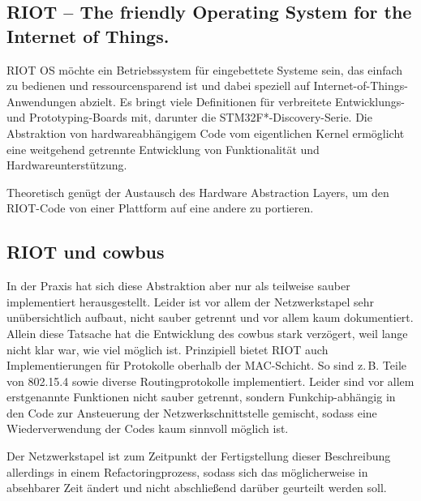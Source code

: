 \documentclass{IEEEtran}
\begin{document}
    \subsection{RIOT -- The friendly Operating System for the Internet of Things.\cite{RIOT}}
        RIOT OS möchte ein Betriebssystem für eingebettete Systeme sein,
        das einfach zu bedienen und ressourcensparend ist und dabei speziell
        auf Internet-of-Things-Anwendungen abzielt. Es bringt viele Definitionen
        für verbreitete Entwicklungs- und Prototyping-Boards mit, darunter die
        STM32F*-Discovery-Serie.
        Die Abstraktion von hardwareabhängigem Code vom eigentlichen Kernel
        ermöglicht eine weitgehend getrennte Entwicklung von Funktionalität und
        Hardwareunterstützung.

        Theoretisch genügt der Austausch des Hardware Abstraction Layers,
        um den RIOT-Code von einer Plattform auf eine andere zu portieren.

    \subsection{RIOT und cowbus}
        In der Praxis hat sich diese Abstraktion aber nur als teilweise sauber
        implementiert herausgestellt. Leider ist vor allem der Netzwerkstapel
        sehr unübersichtlich aufbaut, nicht sauber getrennt und vor allem kaum
        dokumentiert. Allein diese Tatsache hat die Entwicklung des cowbus stark
        verzögert, weil lange nicht klar war, wie viel möglich ist.
        Prinzipiell bietet RIOT auch Implementierungen für Protokolle oberhalb
        der MAC-Schicht. So sind z.\,B. Teile von 802.15.4 sowie diverse
        Routingprotokolle implementiert. Leider sind vor allem erstgenannte
        Funktionen nicht sauber getrennt, sondern Funkchip-abhängig in den
        Code zur Ansteuerung der Netzwerkschnittstelle gemischt, sodass eine
        Wiederverwendung der Codes kaum sinnvoll möglich ist.

        Der Netzwerkstapel ist zum Zeitpunkt der Fertigstellung dieser
        Beschreibung allerdings in einem Refactoringprozess,
        sodass sich das möglicherweise in absehbarer Zeit ändert und nicht
        abschließend darüber geurteilt werden soll.
\end{document}
